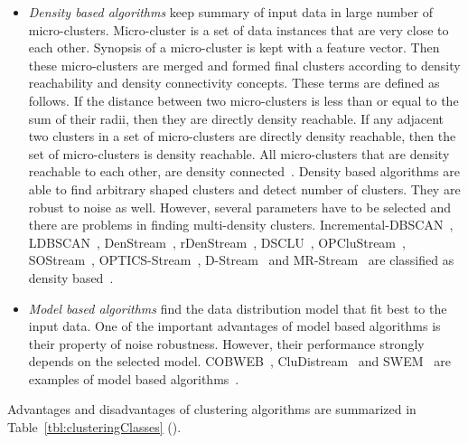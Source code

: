 \documentclass[smallcondensed]{svjour3}     %
\begin{document}
\begin{itemize}
	\item \textit{Density based algorithms} keep summary of input data in large number of micro-clusters. Micro-cluster is a set of data instances that are very close to each other. Synopsis of a micro-cluster is kept with a feature vector. Then these micro-clusters are merged and formed final clusters according to density reachability and density connectivity concepts. These terms are defined as follows. If the distance between two micro-clusters is less than or equal to the sum of their radii, then they are directly density reachable. If any adjacent two clusters in a set of micro-clusters are directly density reachable, then the set of micro-clusters is density reachable. All micro-clusters that are density reachable to each other, are density connected~\citep{Yin2017improvedClustering}. Density based algorithms are able to find arbitrary shaped clusters and detect number of clusters. They are robust to noise as well. However, several parameters have to be selected and there are problems in finding multi-density clusters. Incremental-DBSCAN~\citep{1998:incrementalDBSCAN}, LDBSCAN~\citep{2006:ldbscan}, DenStream~\citep{2006:denstream}, rDenStream~\citep{2009:rDenStream}, DSCLU~\citep{Namadchian2012DSCLUAN}, OPCluStream~\citep{2012:opclustream}, SOStream~\citep{2012:sostream}, OPTICS-Stream~\citep{2007:opticsstream}, D-Stream~\citep{Chen:2007:D-Stream} and MR-Stream~\citep{2009:mr-stream} are classified as density based~\citep{Mousavi:2015:review,Ghesmoune:2016:review}. 
	\item \textit{Model based algorithms} find the data distribution model that fit best to the input data. One of the important advantages of model based algorithms is their property of noise robustness. However, their performance strongly depends on the selected model. COBWEB~\citep{1996:cobweb}, CluDistream~\citep{2007:cludistream} and SWEM~\citep{2009:swem} are examples of model based algorithms~\citep{Mousavi:2015:review}. 
\end{itemize}
Advantages and disadvantages of clustering algorithms are summarized in Table~\ref{tbl:clusteringClasses} (\cite{Mousavi:2015:review, Mansalis:2018:review, Ghesmoune:2016:review}).
\end{document}

